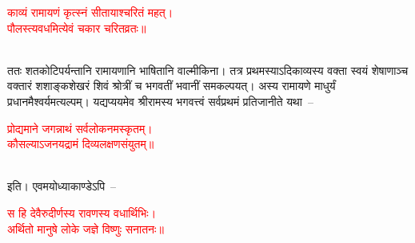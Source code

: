 \centering\textcolor{red}{काव्यं रामायणं कृत्स्नं सीतायाश्चरितं महत्।\nopagebreak\\
पौलस्त्यवधमित्येवं चकार चरितव्रतः॥}\nopagebreak\\
\\
\begin{sloppypar}\justifying\noindent ततः शत\-कोटि\-पर्यन्तानि रामायणानि भाषितानि वाल्मीकिना। तत्र प्रथमस्याऽदि\-काव्यस्य वक्ता स्वयं शेषाणाञ्च वक्तारं शशाङ्क\-शेखरं शिवं श्रोत्रीं च भगवतीं भवानीं समकल्पयत्। अस्य रामायणे माधुर्यं प्रधानमैश्वर्यमत्यल्पम्। यद्यप्ययमेव श्रीरामस्य भगवत्त्वं सर्व\-प्रथमं प्रतिजानीते यथा~–\end{sloppypar}
\centering\textcolor{red}{प्रोद्यमाने जगन्नाथं सर्वलोकनमस्कृतम्।\nopagebreak\\
कौसल्याऽजनयद्रामं दिव्यलक्षणसंयुतम्॥}\nopagebreak\\
\\
\begin{sloppypar}\justifying\noindent इति। एवमयोध्या\-काण्डेऽपि~–\end{sloppypar}
\centering\textcolor{red}{स हि देवैरुदीर्णस्य रावणस्य वधार्थिभिः।\nopagebreak\\
अर्थितो मानुषे लोके जज्ञे विष्णुः सनातनः॥}\nopagebreak\\
\\
